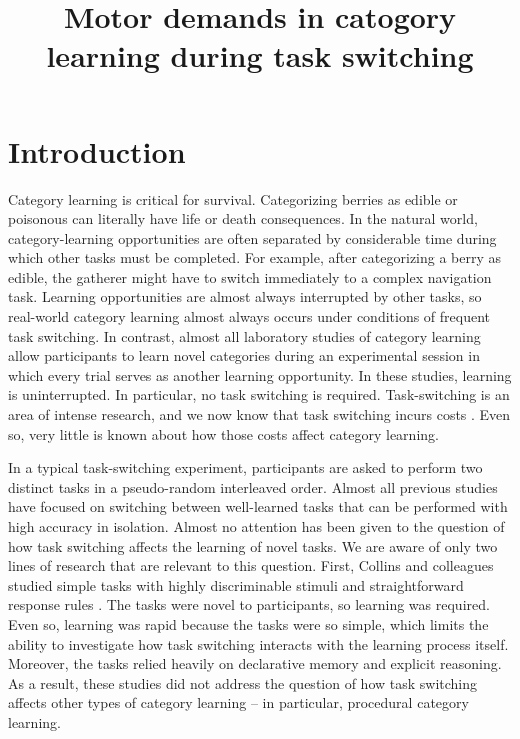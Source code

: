 \documentclass[doc, floatsintext]{apa7}
\title{Motor demands in catogory learning during task switching}
\begin{document}
\maketitle


\section{Introduction}
Category learning is critical for survival. Categorizing berries as edible or poisonous can literally have life or death consequences. In the natural world, category-learning opportunities are often separated by considerable time during which other tasks must be completed. For example, after categorizing a berry as edible, the gatherer might have to switch immediately to a complex navigation task. Learning opportunities are almost always interrupted by other tasks, so real-world category learning almost always occurs under conditions of frequent task switching. In contrast, almost all laboratory studies of category learning allow participants to learn novel categories during an experimental session in which every trial serves as another learning opportunity. In these studies, learning is uninterrupted. In particular, no task switching is required. Task-switching is an area of intense research, and we now know that task switching incurs costs \parencite{kiesel_control_2010, monsell_task_2003}. Even so, very little is known about how those costs affect category learning.

In a typical task-switching experiment, participants are asked to perform two distinct tasks in a pseudo-random interleaved order. Almost all previous studies have focused on switching between well-learned tasks that can be performed with high accuracy in isolation. Almost no attention has been given to the question of how task switching affects the learning of novel tasks. We are aware of only two lines of research that are relevant to this question.  First, Collins and colleagues studied simple tasks with highly discriminable stimuli and straightforward response rules
\parencite{collins_cognitive_2013, collins_human_2014, collins_neural_2016, collins_motor_2016, collins_cost_2017}. The tasks were novel to participants, so learning was required. Even so, learning was rapid because the tasks were so simple, which limits the ability to investigate how task switching interacts with the learning process itself. Moreover, the tasks relied heavily on declarative memory and explicit reasoning. As a result, these studies did not address the question of how task switching affects other types of category learning -- in particular, procedural category learning.
\end{document}
